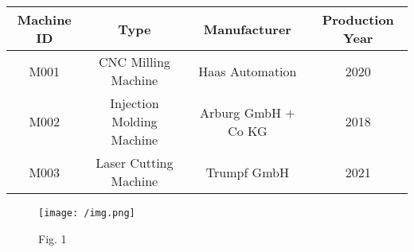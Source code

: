 \documentclass{article}
\begin{document}
\begin{tabular}{|c|c|c|c|}
\hline
Machine ID & Type & Manufacturer & Production Year \\
\hline
M001 & CNC Milling Machine & Haas Automation & 2020 \\
\hline
M002 & Injection Molding Machine & Arburg GmbH + Co KG & 2018 \\
\hline
M003 & Laser Cutting Machine & Trumpf GmbH & 2021 \\
\hline
\end{tabular}
\begin{figure}[h!]
\centering
\texttt{[image: /img.png]}
\caption{Fig. 1}
\end{figure}
\end{document}
